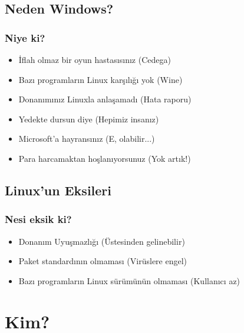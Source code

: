 \documentclass{beamer}
\begin{document}
	\subsection{Neden Windows?}
		\begin{frame}
		 	\frametitle{Niye ki?}
			\begin{itemize}[<+->]
			 \item İflah olmaz bir oyun hastasısınız (Cedega)
			 \item Bazı programların Linux karşılığı yok (Wine)
			 \item Donanımınız Linuxla anlaşamadı (Hata raporu)
			 \item Yedekte dursun diye (Hepimiz insanız)
			 \item Microsoft'a hayransınız (E, olabilir...)
			 \item Para harcamaktan hoşlanıyorsunuz (Yok artık!)
			\end{itemize}

		\end{frame}
	
	\subsection {Linux'un Eksileri}
		\begin{frame}
			\frametitle{Nesi eksik ki?}
			\begin{itemize}[<+->]
			 \item Donanım Uyuşmazlığı (Üstesinden gelinebilir)
			 \item Paket standardının olmaması (Virüslere engel)
			 \item Bazı programların Linux sürümünün olmaması (Kullanıcı az)
			\end{itemize}

		\end{frame}



\section{Kim?}
\end{document}
